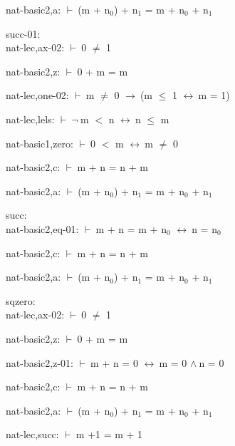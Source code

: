 \documentclass[a4paper]{article}
\newcommand{\Fol}{\mbox{$\vdash\ $}}
\newcommand{\Not}{\mbox{$\neg\ $}}
\newcommand{\And}{\mbox{$\wedge\ $}}
\newcommand{\Imp}{\mbox{$\rightarrow\ $}}
\newcommand{\Equiv}{\mbox{$\leftrightarrow\ $}}
\begin{document}
nat-basic2,a: 
 \Fol (m + $\mbox{n}_{0}$) + $\mbox{n}_{1}$ = m + $\mbox{n}_{0}$ + $\mbox{n}_{1}$



\bigskip

succ-01:\\ nat-lec,ax-02: 
 \Fol 0 $\neq$ 1



nat-basic2,z: 
 \Fol 0 + m = m



nat-lec,one-02: 
 \Fol m $\neq$ 0 \Imp (m $\le$ 1 \Equiv m = 1)



nat-lec,lels: 
 \Fol \Not m $<$ n \Equiv n $\le$ m



nat-basic1,zero: 
 \Fol 0 $<$ m \Equiv m $\neq$ 0



nat-basic2,c: 
 \Fol m + n = n + m



nat-basic2,a: 
 \Fol (m + $\mbox{n}_{0}$) + $\mbox{n}_{1}$ = m + $\mbox{n}_{0}$ + $\mbox{n}_{1}$



\bigskip

succ:\\ nat-basic2,eq-01: 
 \Fol m + n = m + $\mbox{n}_{0}$ \Equiv n = $\mbox{n}_{0}$



nat-basic2,c: 
 \Fol m + n = n + m



nat-basic2,a: 
 \Fol (m + $\mbox{n}_{0}$) + $\mbox{n}_{1}$ = m + $\mbox{n}_{0}$ + $\mbox{n}_{1}$



\bigskip

sqzero:\\ nat-lec,ax-02: 
 \Fol 0 $\neq$ 1



nat-basic2,z: 
 \Fol 0 + m = m



nat-basic2,z-01: 
 \Fol m + n = 0 \Equiv m = 0 \And n = 0



nat-basic2,c: 
 \Fol m + n = n + m



nat-basic2,a: 
 \Fol (m + $\mbox{n}_{0}$) + $\mbox{n}_{1}$ = m + $\mbox{n}_{0}$ + $\mbox{n}_{1}$



nat-lec,succ: 
 \Fol m +1 = m + 1
\end{document}
